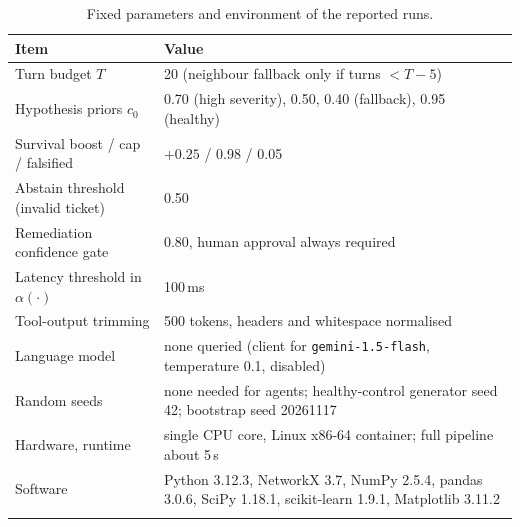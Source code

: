 \documentclass[pdflatex,sn-basic,Numbered,iicol]{sn-jnl}
\begin{document}
\begin{appendices}
\begin{table}[h]
\caption{Fixed parameters and environment of the reported runs.}\label{tab:hyper}
\footnotesize
\begin{tabular}{@{}L{5.0cm}L{10.5cm}@{}}
\toprule
Item & Value \\
\midrule
Turn budget $T$ & 20 (neighbour fallback only if turns $<T-5$) \\
Hypothesis priors $c_0$ & 0.70 (high severity), 0.50, 0.40 (fallback), 0.95 (healthy) \\
Survival boost / cap / falsified & $+0.25$ / 0.98 / 0.05 \\
Abstain threshold (invalid ticket) & 0.50 \\
Remediation confidence gate & 0.80, human approval always required \\
Latency threshold in $\alpha(\cdot)$ & 100\,ms \\
Tool-output trimming & 500 tokens, headers and whitespace normalised \\
Language model & none queried (client for \texttt{gemini-1.5-flash}, temperature 0.1, disabled) \\
Random seeds & none needed for agents; healthy-control generator seed 42; bootstrap seed 20261117 \\
Hardware, runtime & single CPU core, Linux x86-64 container; full pipeline about 5\,s \\
Software & Python 3.12.3, NetworkX 3.7, NumPy 2.5.4, pandas 3.0.6, SciPy 1.18.1, scikit-learn 1.9.1, Matplotlib 3.11.2 \\
\botrule
\end{tabular}
\end{table}

\end{appendices}


\end{document}
